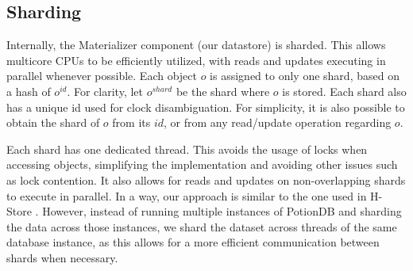\documentclass[sigplan,10pt]{acmart}
\begin{document}

\subsection{Sharding}
\label{subsec:sharding}


Internally, the Materializer component (our datastore) is sharded.
This allows multicore CPUs to be efficiently utilized,
with reads and updates executing in parallel whenever possible.
Each object $o$ is assigned to only one shard, based on a hash of $o^{\mathit{id}}$.
For clarity, let $o^{\mathit{shard}}$ be the shard where $o$ is stored.
Each shard also has a unique id used for clock disambiguation.
For simplicity, it is also possible to obtain the shard of $o$ from its $id$, or from any read/update operation regarding $o$.

Each shard has one dedicated thread.
This avoids the usage of locks when accessing objects, simplifying the implementation and avoiding other issues such as lock contention.
It also allows for reads and updates on non-overlapping shards to execute in parallel.
In a way, our approach is similar to the one used in H-Store \cite{h-store}.
However, instead of running multiple instances of PotionDB and sharding the data across those instances, we shard the dataset across threads of the same database instance, as this allows for a more efficient communication between shards when necessary.

\end{document}
